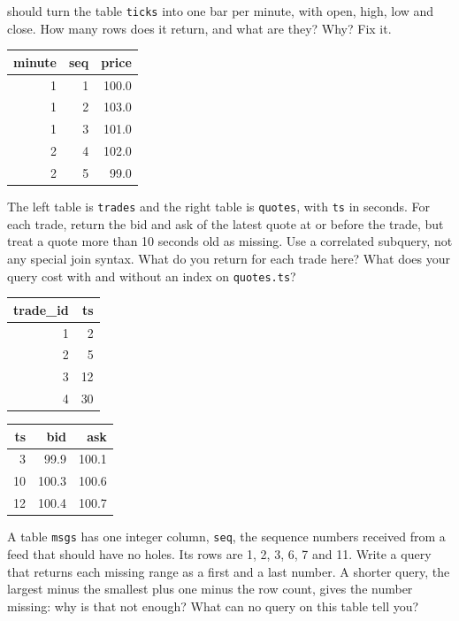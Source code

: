 \begin{question}\label{iq:iv3:sql-and-data:12}
 should turn the table \texttt{ticks} into one bar per minute, with open, high, low and close. How many rows does it return, and what are they? Why? Fix it.
\begin{center}\small
\begin{tabular}{rrr}
minute & seq & price\\\hline
1 & 1 & 100.0\\
1 & 2 & 103.0\\
1 & 3 & 101.0\\
2 & 4 & 102.0\\
2 & 5 & 99.0
\end{tabular}
\end{center}
\label{lst:iv3:sq:barsbad}
\end{question}

\begin{question}\label{iq:iv3:sql-and-data:13}
The left table is \texttt{trades} and the right table is \texttt{quotes}, with \texttt{ts} in seconds. For each trade, return the bid and ask of the latest quote at or before the trade, but treat a quote more than 10 seconds old as missing. Use a correlated subquery, not any special join syntax. What do you return for each trade here? What does your query cost with and without an index on \texttt{quotes.ts}?
\begin{center}\small
\begin{tabular}{rr}
trade\_id & ts\\\hline
1 & 2\\
2 & 5\\
3 & 12\\
4 & 30
\end{tabular}\qquad
\begin{tabular}{rrr}
ts & bid & ask\\\hline
3 & 99.9 & 100.1\\
10 & 100.3 & 100.6\\
12 & 100.4 & 100.7
\end{tabular}
\end{center}
\end{question}

\begin{question}\label{iq:iv3:sql-and-data:14}
A table \texttt{msgs} has one integer column, \texttt{seq}, the sequence numbers received from a feed that should have no holes. Its rows are 1, 2, 3, 6, 7 and 11. Write a query that returns each missing range as a first and a last number. A shorter query, the largest minus the smallest plus one minus the row count, gives the number missing: why is that not enough? What can no query on this table tell you?
\end{question}

